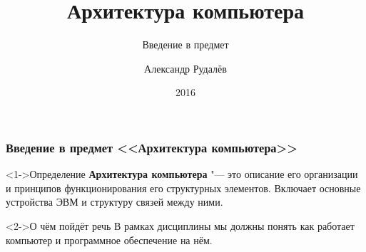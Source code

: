 \documentclass[pdf,9pt,aspectratio=169]{beamer}
\title[]{Архитектура компьютера}
\subtitle{Введение в предмет}
\author[]{Александр Рудалёв}
\institute[]{ИМИКТ САФУ}
\date[]{2016}
\begin{document}
\frame{\titlepage}

\begin{frame}\frametitle{Введение в предмет <<Архитектура компьютера>>}
  \begin{block}<1->{Определение}
    \textbf{Архитектура компьютера} "---  это описание его организации и принципов функционирования его структурных элементов. Включает основные устройства ЭВМ и структуру связей между ними.
  \end{block}
  \begin{block}<2->{О чём пойдёт речь}
    В рамках дисциплины мы должны понять как работает компьютер и программное обеспечение на нём.
  \end{block}
\end{frame}
\end{document}
